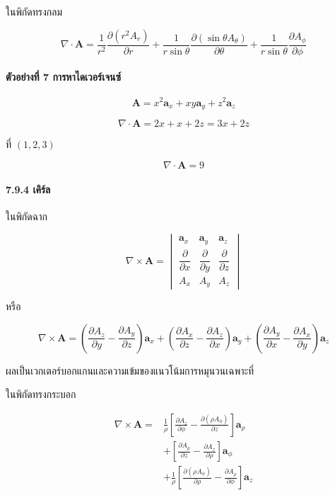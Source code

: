 ในพิกัดทรงกลม

\[
\nabla\cdot\mathbf{A}
=\frac{1}{r^2}\frac{\partial(r^2A_r)}{\partial r}
+\frac{1}{r\sin\theta}\frac{\partial(\sin\theta A_\theta)}{\partial\theta}
+\frac{1}{r\sin\theta}\frac{\partial A_\phi}{\partial\phi}
\]

\paragraph{ตัวอย่างที่ 7 การหาไดเวอร์เจนซ์}

\[
\mathbf{A}=x^2\mathbf{a}_x+xy\mathbf{a}_y+z^2\mathbf{a}_z
\]

\[
\nabla\cdot\mathbf{A}=2x+x+2z=3x+2z
\]

ที่ \((1,2,3)\)

\[
\boxed{\nabla\cdot\mathbf{A}=9}
\]

\paragraph{7.9.4 เคิร์ล}

ในพิกัดฉาก

\[
\nabla\times\mathbf{A}
=
\begin{vmatrix}
\mathbf{a}_x & \mathbf{a}_y & \mathbf{a}_z\\
\dfrac{\partial}{\partial x} & \dfrac{\partial}{\partial y} & \dfrac{\partial}{\partial z}\\
A_x & A_y & A_z
\end{vmatrix}
\]

หรือ

\[
\nabla\times\mathbf{A}
=\left(\frac{\partial A_z}{\partial y}-\frac{\partial A_y}{\partial z}\right)\mathbf{a}_x
+\left(\frac{\partial A_x}{\partial z}-\frac{\partial A_z}{\partial x}\right)\mathbf{a}_y
+\left(\frac{\partial A_y}{\partial x}-\frac{\partial A_x}{\partial y}\right)\mathbf{a}_z
\]

ผลเป็นเวกเตอร์บอกแกนและความเข้มของแนวโน้มการหมุนวนเฉพาะที่

ในพิกัดทรงกระบอก

\[
\begin{aligned}
\nabla\times\mathbf{A}
={}&\frac{1}{\rho}\left[\frac{\partial A_z}{\partial\phi}
-\frac{\partial(\rho A_\phi)}{\partial z}\right]\mathbf{a}_\rho\\
&+\left[\frac{\partial A_\rho}{\partial z}
-\frac{\partial A_z}{\partial\rho}\right]\mathbf{a}_\phi\\
&+\frac{1}{\rho}\left[\frac{\partial(\rho A_\phi)}{\partial\rho}
-\frac{\partial A_\rho}{\partial\phi}\right]\mathbf{a}_z
\end{aligned}
\]

